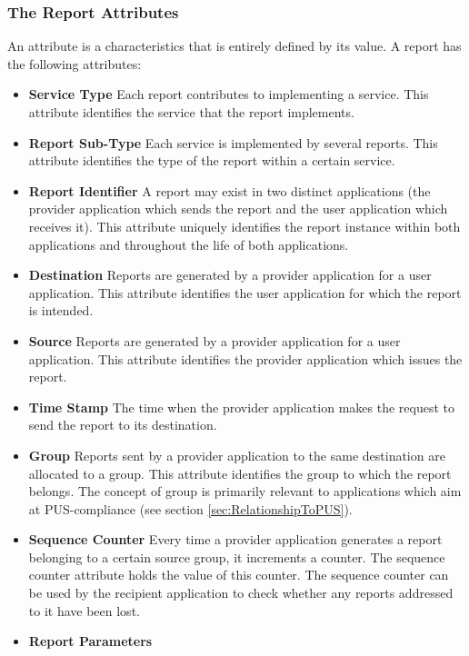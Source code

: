 \subsubsection{The Report Attributes}\label{sec:RepAttributes}

An attribute is a characteristics that is entirely defined by its value. A report has the following attributes:

\begin{itemize}
\item \textbf{Service Type}
Each report contributes to implementing a service. This attribute identifies the service that the report implements. 
\item \textbf{Report Sub-Type}
Each service is implemented by several reports. This attribute identifies the type of the report within a certain service. 
\item \textbf{Report Identifier}
A report may exist in two distinct applications (the provider application which sends the report and the user application which receives it). This attribute uniquely identifies the report instance within both applications and throughout the life of both applications.
\item \textbf{Destination}
Reports are generated by a provider application for a user application. This attribute identifies the user application for which the report is intended.
\item \textbf{Source}
Reports are generated by a provider application for a user application. This attribute identifies the provider application which issues the report.
\item \textbf{Time Stamp}
The time when the provider application makes the request to send the report to its destination.
\item \textbf{Group}
Reports sent by a provider application to the same destination are allocated to a group. This attribute identifies the group to which the report belongs. The concept of group is primarily relevant to applications which aim at PUS-compliance (see section \ref{sec:RelationshipToPUS}).  
\item \textbf{Sequence Counter}
Every time a provider application generates a report belonging to a certain source group, it increments a counter. The sequence counter attribute holds the value of this counter. The sequence counter can be used by the recipient application to check whether any reports addressed to it have been lost. 
\item \textbf{Report Parameters}

\end{itemize}
